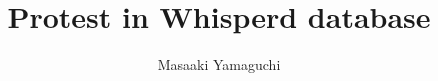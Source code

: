 \documentclass{jsarticle}
\begin{document}
\title{Protest in Whisperd database}
\author{Masaaki Yamaguchi}
\date{}
\maketitle

    \newcommand{\variint}{%
	\begin{picture}(15,30)
		\put(0,0){
			$ \iint $}
		\put(0,5){\line(15,0){15}}
	\end{picture} %
}

\newcommand{\variiint}{%
	\begin{picture}(15,15)
		\put(0,0){
			$ \iiint $}
		\put(0,5){\line(15,0){20}}
	\end{picture} %
}



 \newcommand{\alearletter}{%
	 \begin{picture}(10,20)
		 \put(0,0){
			 $ \square $}
		 \put(0,0){\line(1,1){10}}
	 \end{picture} %
	 }

 \newcommand{\secproduct}{%
	 \begin{picture}(10,20)
		 \put(0,0){
			 $ \nabla $}
		 \put(5,0){+}
	 \end{picture} %
	 }
 \newcommand{\talot}{%
	 \begin{picture}(15,20)
		 \put(0,0){
			 $ \text{\scalebox{2.0}[2]{$\nabla$}}$}
		 \put(5,3){
			 $ \Delta $}
	 \end{picture} %
	 }
 \newcommand{\hazerdnabla}{%
	 \begin{picture}(15,20)
		 \put(0,0){
			 $ \text{\scalebox{2.0}[2]{$\nabla$}}$}
		 \put(5,3){
			 $\text{Y}  $}
	 \end{picture} %
	 }

 \newcommand{\securebox}{%
	 \begin{picture}(15,20)
		 \put(0,0){
			 $ \text{\scalebox{2.0}[2]{$\square$}}$}
		 \put(5,3){
			 $\text{Y}  $}
	 \end{picture} %
	 }


\newcommand{\timebow}{%
	\begin{picture}(5,5)
		\put(0,0){$\text{\rotatebox{90}{$\bowtie$}}$}
	\end{picture} %
	}


 \newcommand{\flowerletter}{%
	 \begin{picture}(10,20)
		 \put(0,0){$\text{\scalebox{1.0}[1]{$\square$}}$}
		 \put(0,0){$\text{\scalebox{1.0}[2]{$\int$}}$}
	 \end{picture} %
	 }
\newcommand{\squareiint}{%
	\begin{picture}(15,30)
		\put(0,0){
			$ \iint $}
		\put(0,5){$\text{\scalebox{2.0}[1]{$\square$}}$}
	\end{picture} %
}
\end{document}
